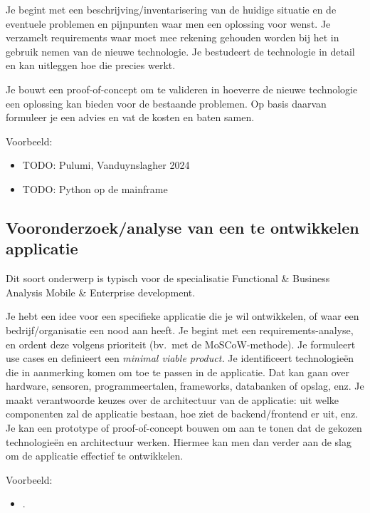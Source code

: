 Je begint met een beschrijving/inventarisering van de huidige situatie en de eventuele problemen en pijnpunten waar men een oplossing voor wenst. Je verzamelt requirements waar moet mee rekening gehouden worden bij het in gebruik nemen van de nieuwe technologie. Je bestudeert de technologie in detail en kan uitleggen hoe die precies werkt.

Je bouwt een proof-of-concept om te valideren in hoeverre de nieuwe technologie een oplossing kan bieden voor de bestaande problemen. Op basis daarvan formuleer je een advies en vat de kosten en baten samen.

Voorbeeld:

\begin{itemize}
  \item TODO: Pulumi, Vanduynslagher 2024
  \item TODO: Python op de mainframe
\end{itemize}

\subsection{Vooronderzoek/analyse van een te ontwikkelen applicatie}%
\label{ssec:onderwerp_types_vooronderzoek_analyse}

Dit soort onderwerp is typisch voor de specialisatie Functional \& Business Analysis Mobile \& Enterprise development.

Je hebt een idee voor een specifieke applicatie die je wil ontwikkelen, of waar een bedrijf/organisatie een nood aan heeft. Je begint met een requirements-analyse, en ordent deze volgens prioriteit (bv.\ met de MoSCoW-methode). Je formuleert use cases en definieert een \emph{minimal viable product.} Je identificeert technologieën die in aanmerking komen om toe te passen in de applicatie. Dat kan gaan over hardware, sensoren, programmeertalen, frameworks, databanken of opslag, enz. Je maakt verantwoorde keuzes over de architectuur van de applicatie: uit welke componenten zal de applicatie bestaan, hoe ziet de backend/frontend er uit, enz. Je kan een prototype of proof-of-concept bouwen om aan te tonen dat de gekozen technologieën en architectuur werken. Hiermee kan men dan verder aan de slag om de applicatie effectief te ontwikkelen.

Voorbeeld:

\begin{itemize}
  \item {} \autocite{VanDerPlaetsen2013}.
\end{itemize}

